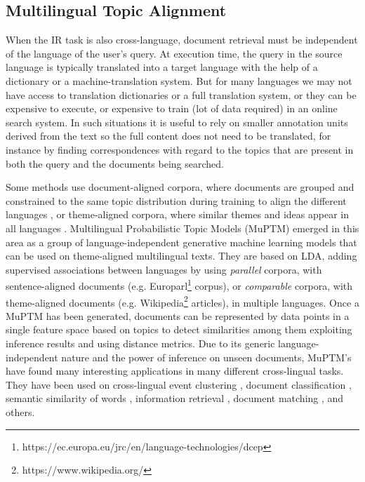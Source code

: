 \subsection{Multilingual Topic Alignment}
\label{sec:multi-topic-alignment}

When the IR task is also cross-language, document retrieval must be independent of the language of the user's query. At execution time, the query in the source language is typically translated into a target language with the help of a dictionary or a machine-translation system. But for many languages we may not have access to translation dictionaries or a full translation system, or they can be expensive to execute, or expensive to train (lot of data required) in an online search system. In such situations it is useful to rely on smaller annotation units derived from the text so the full content does not need to be translated, for instance by finding correspondences with regard to the topics that are present in both the query and the documents being searched.

Some methods use document-aligned corpora, where documents are grouped and constrained to the same topic distribution during training to align the different languages \citep{mimno-etal-2009-polylingual, Ni2009, Fukumasu2012, Zhang2013}, or theme-aligned corpora, where similar themes and ideas appear in all languages \citep{Graber2009}. Multilingual Probabilistic Topic Models (MuPTM) \citep{Vulic2015} emerged in this area as a group of language-independent generative machine learning models that can be used on theme-aligned multilingual texts. They are based on LDA, adding supervised associations between languages by using \textit{parallel} corpora, with sentence-aligned documents (e.g. Europarl\footnote{https://ec.europa.eu/jrc/en/language-technologies/dcep} corpus), or \textit{comparable} corpora, with theme-aligned documents (e.g. Wikipedia\footnote{https://www.wikipedia.org/} articles), in multiple languages. Once a MuPTM has been generated, documents can be represented by data points in a single feature space based on topics to detect similarities among them exploiting inference results and using distance metrics. Due to its generic language-independent nature and the power of inference on unseen documents, MuPTM's have found many interesting applications in many different cross-lingual tasks. They have been used on cross-lingual event clustering \citep{Smet2009}, document classification \citep{10.1007/978-3-642-20841-6_45, Ni:2011:CLT:1935826.1935887},  semantic similarity of words \citep{mimno-etal-2009-polylingual, Vulic:2012:DHC:2380816.2380872}, information retrieval \citep{10.1007/978-3-642-36973-5_9, ganguly-etal-2012-cross}, document matching \citep{Platt:2010:TDR:1870658.1870683, zhu-etal-2013-building}, and others. 

